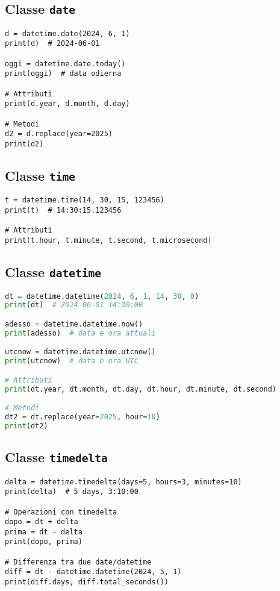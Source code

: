 \documentclass[a4paper,12pt]{article}
\begin{document}
\subsection*{Classe \texttt{date}}
\begin{lstlisting}
d = datetime.date(2024, 6, 1)
print(d)  # 2024-06-01

oggi = datetime.date.today()
print(oggi)  # data odierna

# Attributi
print(d.year, d.month, d.day)

# Metodi
d2 = d.replace(year=2025)
print(d2)
\end{lstlisting}

\subsection*{Classe \texttt{time}}
\begin{lstlisting}
t = datetime.time(14, 30, 15, 123456)
print(t)  # 14:30:15.123456

# Attributi
print(t.hour, t.minute, t.second, t.microsecond)
\end{lstlisting}

\subsection*{Classe \texttt{datetime}}
\begin{lstlisting}[language=Python, basicstyle=\ttfamily\footnotesize, breaklines=true, frame=single]
dt = datetime.datetime(2024, 6, 1, 14, 30, 0)
print(dt)  # 2024-06-01 14:30:00

adesso = datetime.datetime.now()
print(adesso)  # data e ora attuali

utcnow = datetime.datetime.utcnow()
print(utcnow)  # data e ora UTC

# Attributi
print(dt.year, dt.month, dt.day, dt.hour, dt.minute, dt.second)

# Metodi
dt2 = dt.replace(year=2025, hour=10)
print(dt2)
\end{lstlisting}

\subsection*{Classe \texttt{timedelta}}
\begin{lstlisting}
delta = datetime.timedelta(days=5, hours=3, minutes=10)
print(delta)  # 5 days, 3:10:00

# Operazioni con timedelta
dopo = dt + delta
prima = dt - delta
print(dopo, prima)

# Differenza tra due date/datetime
diff = dt - datetime.datetime(2024, 5, 1)
print(diff.days, diff.total_seconds())
\end{lstlisting}
\end{document}
